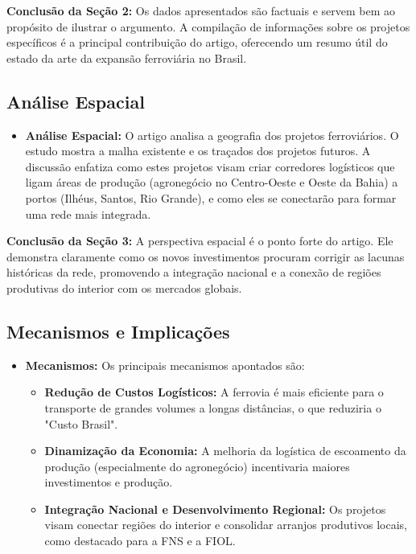\documentclass[12pt, a4paper]{article}
\begin{document}
\noindent\textbf{Conclusão da Seção 2:} Os dados apresentados são factuais e servem bem ao propósito de ilustrar o argumento. A compilação de informações sobre os projetos específicos é a principal contribuição do artigo, oferecendo um resumo útil do estado da arte da expansão ferroviária no Brasil.

\subsection{Análise Espacial}

\begin{itemize}
    \item \textbf{Análise Espacial:} O artigo analisa a geografia dos projetos ferroviários. O estudo mostra a malha existente e os traçados dos projetos futuros. A discussão enfatiza como estes projetos visam criar corredores logísticos que ligam áreas de produção (agronegócio no Centro-Oeste e Oeste da Bahia) a portos (Ilhéus, Santos, Rio Grande), e como eles se conectarão para formar uma rede mais integrada.
\end{itemize}

\noindent\textbf{Conclusão da Seção 3:} A perspectiva espacial é o ponto forte do artigo. Ele demonstra claramente como os novos investimentos procuram corrigir as lacunas históricas da rede, promovendo a integração nacional e a conexão de regiões produtivas do interior com os mercados globais.

\subsection{Mecanismos e Implicações}

\begin{itemize}
    \item \textbf{Mecanismos:} Os principais mecanismos apontados são:
        \begin{itemize}
            \item \textbf{Redução de Custos Logísticos:} A ferrovia é mais eficiente para o transporte de grandes volumes a longas distâncias, o que reduziria o "Custo Brasil".
            \item \textbf{Dinamização da Economia:} A melhoria da logística de escoamento da produção (especialmente do agronegócio) incentivaria maiores investimentos e produção.
            \item \textbf{Integração Nacional e Desenvolvimento Regional:} Os projetos visam conectar regiões do interior e consolidar arranjos produtivos locais, como destacado para a FNS e a FIOL.
        \end{itemize}
\end{itemize}
\end{document}
